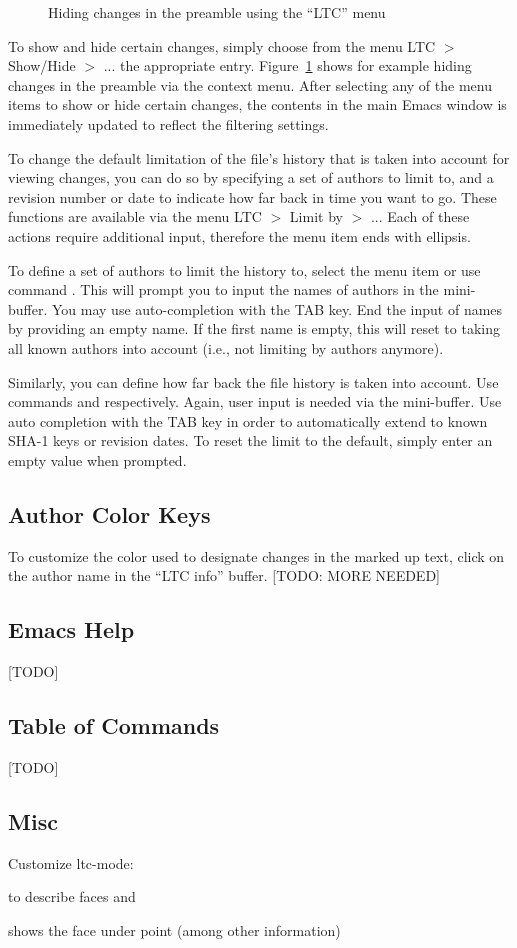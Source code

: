 \begin{figure}[t]
\centering
{}
\caption{Hiding changes in the preamble using the ``LTC'' menu} \label{fig:emacs-hide-preamble}
\end{figure}

To show and hide certain changes, simply choose from the menu LTC $>$ Show/Hide $>$ ... the appropriate entry.  Figure~\ref{fig:emacs-hide-preamble} shows for example hiding changes in the preamble via the context menu.  %
After selecting any of the menu items to show or hide certain changes, the contents in the main Emacs window is immediately updated to reflect the filtering settings.

To change the default limitation of the file's history that is taken into account for viewing changes, you can do so by specifying a set of authors to limit to, and a revision number or date to indicate how far back in time you want to go.  These functions are available via the menu LTC $>$ Limit by $>$ ...  Each of these actions require additional input, therefore the menu item ends with ellipsis. 

To define a set of authors to limit the history to, select the menu item or use command . This will prompt you to input the names of authors in the mini-buffer.  You may use auto-completion with the TAB key.  End the input of names by providing an empty name.  If the first name is empty, this will reset to taking all known authors into account (i.e., not limiting by authors anymore).

Similarly, you can define how far back the file history is taken into account.  Use commands  
and  respectively.  Again, user input is needed via the mini-buffer.  Use auto completion with the TAB key in order to automatically extend to known SHA-1 keys or revision dates.  To reset the limit to the default, simply enter an empty value when prompted.

\subsection{Author Color Keys}

To customize the color used to designate changes in the marked up text, click on the author name in the ``LTC info'' buffer. [TODO: MORE NEEDED]

\subsection{Emacs Help}

[TODO]

\subsection{Table of Commands}

[TODO]

\subsection{Misc}

Customize ltc-mode: 

 to describe faces  and 

 shows the face under point (among other information)
